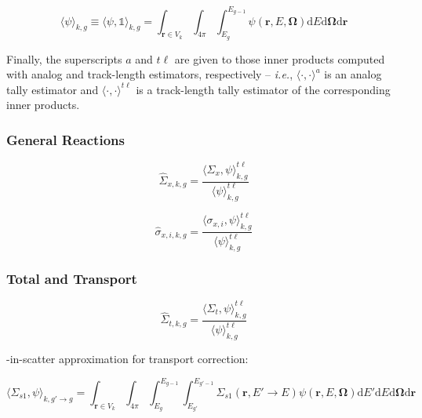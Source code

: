 \begin{equation}
\label{eqn:chap3-angle-flux}
\langle \psi \rangle_{k,g} \equiv \langle \psi, \mathbb{1} \rangle_{k,g} = \int_{\mathbf{r} \in V_{k}} \int_{4\pi} \int_{E_{g}}^{E_{g-1}} \psi(\mathbf{r},E,\mathbf{\Omega}) \mathrm{d}E\mathrm{d}\mathbf{\Omega}\mathrm{d}\mathbf{r}
\end{equation}

Finally, the superscripts $a$ and $t\ell$ are given to those inner products computed with analog and track-length estimators, respectively -- \textit{i.e.}, $\langle \cdot,\cdot \rangle^{a}$ is an analog tally estimator and $\langle \cdot,\cdot \rangle^{t\ell}$ is a track-length tally estimator of the corresponding inner products.


\subsubsection{General Reactions}
\label{subsubsec:chap3-gen-xs}

\begin{equation}
\label{eqn:chap3-general-macro}
\hat{\Sigma}_{x,k,g} = \frac{\langle \Sigma_{x}, \psi \rangle_{k,g}^{t\ell}}{\langle \psi \rangle_{k,g}^{t\ell}}
\end{equation}

\begin{equation}
\label{eqn:chap3-general-micro}
\hat{\sigma}_{x,i,k,g} = \frac{\langle \sigma_{x,i}, \psi \rangle_{k,g}^{t\ell}}{\langle \psi \rangle_{k,g}^{t\ell}}
\end{equation}



\subsubsection{Total and Transport}
\label{subsubsec:chap3-tally-types-tot-xs}

\begin{equation}
\label{eqn:chap3-total-macro}
\hat{\Sigma}_{t,k,g} = \frac{\langle \Sigma_{t}, \psi \rangle_{k,g}^{t\ell}}{\langle \psi \rangle_{k,g}^{t\ell}}
\end{equation}

-in-scatter approximation for transport correction:

\begin{equation}
\label{eqn:chap3-sigs1}
\langle \Sigma_{s1}, \psi \rangle_{k,g'\rightarrow g} = \int_{\mathbf{r} \in V_{k}} \int_{4\pi} \int_{E_{g}}^{E_{g-1}} \int_{E_{g'}}^{E_{g'-1}} \Sigma_{s1}(\mathbf{r},E'\rightarrow E)\psi(\mathbf{r},E,\mathbf{\Omega}) \mathrm{d}E'\mathrm{d}E\mathrm{d}\mathbf{\Omega}\mathrm{d}\mathbf{r}
\end{equation}


